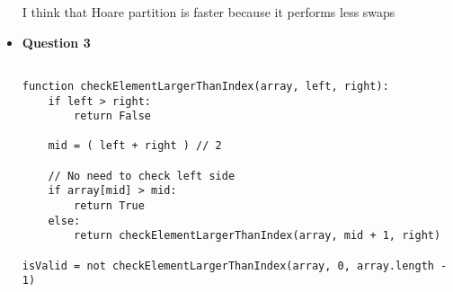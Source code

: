 \documentclass{article}
\begin{document}
\begin{itemize}
\begin{enumerate}
        \end{enumerate}

        I think that Hoare partition is faster because it performs less swaps

    \item\textbf{Question 3}

    \begin{lstlisting}

function checkElementLargerThanIndex(array, left, right):
    if left > right:
        return False

    mid = ( left + right ) // 2

    // No need to check left side
    if array[mid] > mid:
        return True
    else:
        return checkElementLargerThanIndex(array, mid + 1, right)

isValid = not checkElementLargerThanIndex(array, 0, array.length - 1)


    \end{lstlisting}



\end{itemize}
\end{document}

